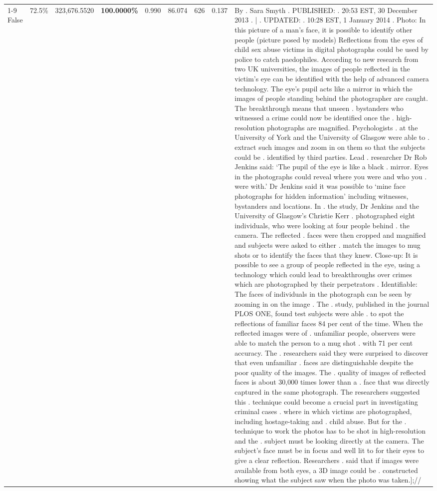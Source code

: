 \begin{table}[H]
\begin{tabular}{lllrlllll}
\cline{1-9} \cline{2-9}
False & 72.5\% & 323,676.5520 & \bfseries \color{red} 100.0000\% & 0.990 & 86.074 & 626 & 0.137 & By . Sara Smyth . PUBLISHED: . 20:53 EST, 30 December 2013 . | . UPDATED: . 10:28 EST, 1 January 2014 . Photo: In this picture of a man's face, it is possible to identify other people (picture posed by models) Reflections from the eyes of child sex abuse victims in digital photographs could be used by police to catch paedophiles. According to new research from two UK universities, the images of people reflected in the victim's eye can be identified with the help of advanced camera technology. The eye's pupil acts like a mirror in which the images of people standing behind the photographer are caught. The breakthrough means that unseen . bystanders who witnessed a crime could now be identified once the . high-resolution photographs are magnified. Psychologists . at the University of York and the University of Glasgow were able to . extract such images and zoom in on them so that the subjects could be . identified by third parties. Lead . researcher Dr Rob Jenkins said: ‘The pupil of the eye is like a black . mirror. Eyes in the photographs could reveal where you were and who you . were with.' Dr Jenkins said it was possible to ‘mine face photographs for hidden information' including witnesses, bystanders and locations. In . the study, Dr Jenkins and the University of Glasgow's Christie Kerr . photographed eight individuals, who were looking at four people behind . the camera. The reflected . faces were then cropped and magnified and subjects were asked to either . match the images to mug shots or to identify the faces that they knew. Close-up: It is possible to see a group of people reflected in the eye, using a technology which could lead to breakthroughs over crimes which are photographed by their perpetrators . Identifiable: The faces of individuals in the photograph can be seen by zooming in on the image . The . study, published in the journal PLOS ONE, found test subjects were able . to spot the reflections of familiar faces 84 per cent of the time. When the reflected images were of . unfamiliar people, observers were able to match the person to a mug shot . with 71 per cent accuracy. The . researchers said they were surprised to discover that even unfamiliar . faces are distinguishable despite the poor quality of the images. The . quality of images of reflected faces is about 30,000 times lower than a . face that was directly captured in the same photograph. The researchers suggested this . technique could become a crucial part in investigating criminal cases . where in which victims are photographed, including hostage-taking and . child abuse. But for the . technique to work the photos has to be shot in high-resolution and the . subject must be looking directly at the camera. The subject's face must be in focus and well lit to for their eyes to give a clear reflection. Researchers . said that if images were available from both eyes, a 3D image could be . constructed showing what the subject saw when the photo was taken.];// \\

\end{tabular}
\end{table}
